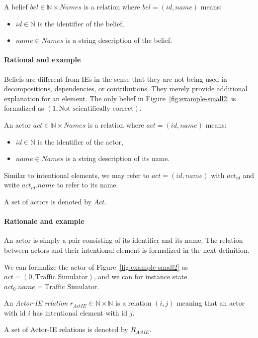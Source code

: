 \begin{definition}[Belief]
\label{def:belief}
A belief $bel\in \mathbb{N}\times Names$ is a relation where $bel=(id,name)$ means:
\begin{itemize}
\item $id\in\mathbb{N}$ is the identifier of the belief,
\item $name\in Names$ is a string description of the belief.
\end{itemize}
\end{definition}

\paragraph{Rational and example} Beliefs are different from IEs in the sense that they are not being used in decompositions, dependencies, or contributions. They merely provide additional explanation for an element. The only belief in Figure~\ref{fig:example-small2} is formalized as $(1, \text{Not scientifically correct})$.

\begin{definition}[Actor]
\label{def:actor}
An actor $act \in \mathbb{N}\times Names$ is a relation where $act=(id,name)$ means:
\begin{itemize}
\item $id\in\mathbb{N}$ is the identifier of the actor, 
\item $name\in Names$ is a string description of its name.
\end{itemize}

Similar to intentional elements, we may refer to $act = (id,name)$ with $act_{id}$ and write $act_{id}.name$ to refer to its name.

A set of actors is denoted by $Act$.
\end{definition}

\paragraph{Rationale and example} An actor is simply a pair consisting of its identifier and its name. The relation between actors and their intentional element is formalized in the next definition. 

We can formalize the actor of Figure~\ref{fig:example-small2} as $act=(0,\text{Traffic Simulator})$, and we can for instance state $act_0.name = \text{Traffic Simulator}$.

\begin{definition}
\label{def:act-ie-relation}
An \emph{Actor-IE relation} $r_{ActIE}\in\mathbb{N}\times\mathbb{N}$ is a relation $(i,j)$ meaning that an actor with id $i$ has intentional element with id $j$.

A set of Actor-IE relations is denoted by $R_{ActIE}$.
\end{definition}

